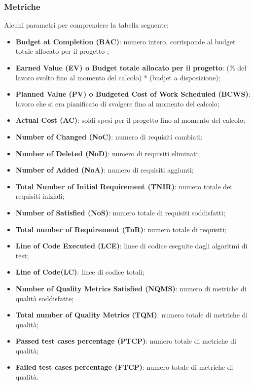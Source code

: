 \subsubsection{Metriche}
Alcuni parametri per comprendere la tabella seguente:
\begin{itemize}
	\item \textbf{Budget at Completion (BAC)}: numero intero, corrisponde al budget totale allocato per il progetto ;

	\item \textbf{Earned Value (EV) o Budget totale allocato per il progetto}: (\% del lavoro svolto fino al momento del calcolo) * (budjet a disposizione);
	
	\item \textbf{Planned Value (PV) o Budgeted Cost of Work Scheduled (BCWS)}: lavoro che si era pianificato di svolgere fino al momento del calcolo;
	
	\item \textbf{Actual Cost (AC)}: soldi spesi per il progetto fino al momento del calcolo;
	
	\item \textbf{Number of Changed (NoC)}: numero di requisiti cambiati;
	
	\item \textbf{Number of Deleted (NoD)}: numero di requisiti eliminati;
	
	\item \textbf{Number of Added (NoA)}: numero di requisiti aggiunti;
	
	\item \textbf{Total Number of Initial Requirement (TNIR)}: numero totale dei requisiti iniziali;
	
	\item \textbf{Number of Satisfied (NoS)}: numero totale di requisiti soddisfatti;
	
	\item \textbf{Total number of Requirement (TnR)}: numero totale di requisiti;
	
	\item \textbf{Line of Code Executed (LCE)}: linee di codice eseguite dagli algoritmi di test;
	
	\item \textbf{Line of Code(LC)}: linee di codice totali;
	
	\item \textbf{Number of Quality Metrics Satisfied (NQMS)}: numero di metriche di qualità soddisfatte;
	
	\item \textbf{Total number of Quality Metrics (TQM)}: numero totale di metriche di qualità;
	
	\item \textbf{Passed test cases percentage (PTCP)}: numero totale di metriche di qualità;
	
	\item \textbf{Failed test cases percentage (FTCP)}: numero totale di metriche di qualità.
	
\end{itemize}

